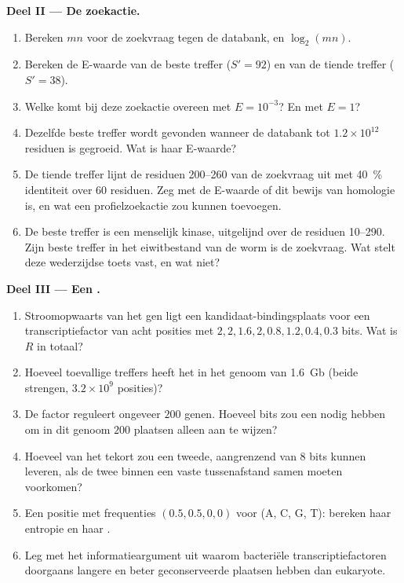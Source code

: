\begin{problem}
\medskip
\noindent\textbf{Deel II --- De zoekactie.}
\begin{enumerate}[resume]
  \item Bereken $mn$ voor de zoekvraag tegen de databank, en
        $\log_{2}(mn)$.
  \item Bereken de E-waarde van de beste treffer ($S' = 92$) en van de
        tiende treffer ($S' = 38$).
  \item Welke  komt bij deze zoekactie overeen met
        $E = 10^{-3}$? En met $E = 1$?
  \item Dezelfde beste treffer wordt gevonden wanneer de databank tot
        $1.2\times 10^{12}$ residuen is gegroeid. Wat is haar E-waarde?
  \item De tiende treffer lijnt de residuen 200--260 van de zoekvraag
        uit met \qty{40}{\%} identiteit over $60$ residuen. Zeg met de
        E-waarde of dit bewijs van homologie is, en wat een
        profielzoekactie zou kunnen toevoegen.
  \item De beste treffer is een menselijk kinase, uitgelijnd over de
        residuen 10--290. Zijn beste treffer in het eiwitbestand van de
        worm is de zoekvraag. Wat stelt deze wederzijdse toets vast, en
        wat niet?
\end{enumerate}

\medskip
\noindent\textbf{Deel III --- Een .}
\begin{enumerate}[resume]
  \item Stroomopwaarts van het gen ligt een kandidaat-bindingsplaats
        voor een transcriptiefactor van acht posities met
         $2, 2, 1.6, 2, 0.8, 1.2, 0.4, 0.3$ bits.
        Wat is $R$ in totaal?
  \item Hoeveel toevallige treffers heeft het  in het genoom van
        \qty{1.6}{Gb} (beide strengen, $3.2\times 10^{9}$ posities)?
  \item De factor reguleert ongeveer $200$ genen. Hoeveel bits zou een
         nodig hebben om in dit genoom $200$ plaatsen alleen aan
        te wijzen?
  \item Hoeveel van het tekort zou een tweede, aangrenzend  van
        $8$ bits kunnen leveren, als de twee binnen een vaste
        tussenafstand samen moeten voorkomen?
  \item Een positie met frequenties $(0.5, 0.5, 0, 0)$ voor (A, C, G,
        T): bereken haar entropie en haar .
  \item Leg met het informatieargument uit waarom bacteriële
        transcriptiefactoren doorgaans langere en beter geconserveerde
        plaatsen hebben dan eukaryote.
\end{enumerate}


\end{problem}
